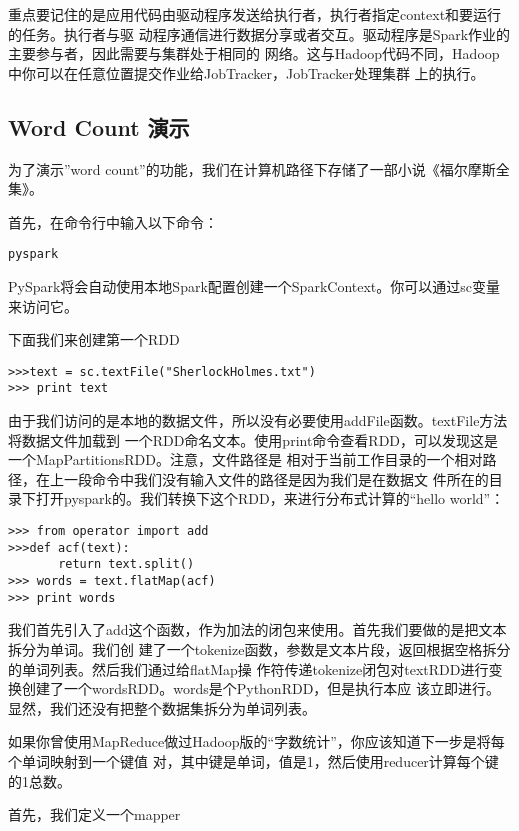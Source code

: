 重点要记住的是应用代码由驱动程序发送给执行者，执行者指定context和要运行的任务。执行者与驱
动程序通信进行数据分享或者交互。驱动程序是Spark作业的主要参与者，因此需要与集群处于相同的
网络。这与Hadoop代码不同，Hadoop中你可以在任意位置提交作业给JobTracker，JobTracker处理集群
上的执行。

\subsection{Word Count 演示}\label{word-count-ux6f14ux793a}

为了演示''word
count''的功能，我们在计算机路径下存储了一部小说《福尔摩斯全集》。

首先，在命令行中输入以下命令：

\begin{lstlisting}
pyspark
\end{lstlisting}

PySpark将会自动使用本地Spark配置创建一个SparkContext。你可以通过sc变量来访问它。

下面我们来创建第一个RDD

\begin{lstlisting}
>>>text = sc.textFile("SherlockHolmes.txt")
>>> print text
\end{lstlisting}

由于我们访问的是本地的数据文件，所以没有必要使用addFile函数。textFile方法将数据文件加载到
一个RDD命名文本。使用print命令查看RDD，可以发现这是一个MapPartitionsRDD。注意，文件路径是
相对于当前工作目录的一个相对路径，在上一段命令中我们没有输入文件的路径是因为我们是在数据文
件所在的目录下打开pyspark的。我们转换下这个RDD，来进行分布式计算的``hello
world''：

\begin{lstlisting}
>>> from operator import add
>>>def acf(text):
       return text.split()
>>> words = text.flatMap(acf)
>>> print words
\end{lstlisting}

我们首先引入了add这个函数，作为加法的闭包来使用。首先我们要做的是把文本拆分为单词。我们创
建了一个tokenize函数，参数是文本片段，返回根据空格拆分的单词列表。然后我们通过给flatMap操
作符传递tokenize闭包对textRDD进行变换创建了一个wordsRDD。words是个PythonRDD，但是执行本应
该立即进行。显然，我们还没有把整个数据集拆分为单词列表。

如果你曾使用MapReduce做过Hadoop版的``字数统计''，你应该知道下一步是将每个单词映射到一个键值
对，其中键是单词，值是1，然后使用reducer计算每个键的1总数。

首先，我们定义一个mapper


